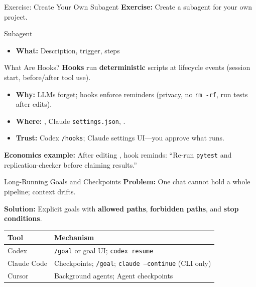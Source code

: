 \begin{frame}{Exercise: Create Your Own Subagent}
  \textbf{Exercise:} Create a subagent for your own project.
  \vspace{1em}
  \begin{block}{Subagent}
    \begin{itemize}
      \item \textbf{What:} \textnormal{Description, trigger, steps}
    \end{itemize}
  \end{block}
\end{frame}
\begin{frame}{What Are Hooks?}
  \textbf{Hooks} run \textbf{deterministic} scripts at lifecycle events (session start, before/after tool use).
  \begin{itemize}
    \item \textbf{Why:} \textnormal{LLMs forget; hooks enforce reminders (privacy, no \texttt{rm -rf}, run tests after edits).}
    \item \textbf{Where:} \textnormal{, Claude \texttt{settings.json}, .}
    \item \textbf{Trust:} \textnormal{Codex \texttt{/hooks}; Claude settings UI---you approve what runs.}
  \end{itemize}
  \vspace{0.3em}
  \textbf{Economics example:} \textnormal{After editing , hook reminds: ``Re-run \texttt{pytest} and replication-checker before claiming results.''}
\end{frame}

\begin{frame}{Long-Running Goals and Checkpoints}
  \textbf{Problem:} \textnormal{One chat cannot hold a whole pipeline; context drifts.}

  \textbf{Solution:} \textnormal{Explicit goals with \textbf{allowed paths}, \textbf{forbidden paths}, and \textbf{stop conditions}.}
  \vspace{0.3em}
  \begin{tabular}{@{}ll@{}}
    \toprule
    \textbf{Tool} & \textbf{Mechanism} \\
    \midrule
    Codex & \texttt{/goal} or goal UI; \texttt{codex resume} \\
    Claude Code & Checkpoints; \texttt{/goal}; \texttt{claude --continue} (CLI only) \\
    Cursor & Background agents; Agent checkpoints \\
    \bottomrule
  \end{tabular}
  \vspace{1.35em}\\
  
\end{frame}

